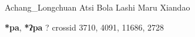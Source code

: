 \begin{list}{}{\leftmargin=1.5em \itemindent=-1.5em}
         Achang\_Longchuan 
\hspace{1ex}
         Atsi 
\hspace{1ex}
         Bola 
\hspace{1ex}
         Lashi 
\hspace{1ex}
         Maru 
\hspace{1ex}
         Xiandao 
  \end{list}
\item
\textbf{*pa}, \textbf{*ʔpa}
?
  {\tiny crossid 3710, 4091, 11686, 2728}
